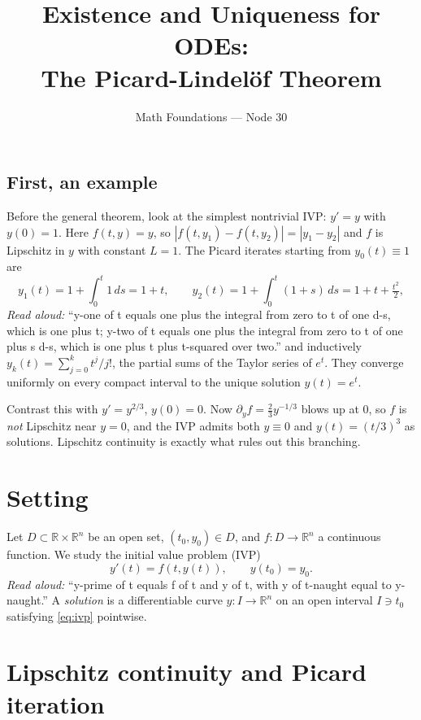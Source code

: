 \documentclass[11pt]{article}
\title{Existence and Uniqueness for ODEs:\\ The Picard-Lindel\"of Theorem}
\author{Math Foundations --- Node 30}
\date{}
\theoremstyle{definition}
\theoremstyle{remark}
\newcommand{\R}{\mathbb{R}}
\begin{document}
\maketitle

\subsection*{First, an example}

Before the general theorem, look at the simplest nontrivial IVP:
$y' = y$ with $y(0) = 1$. Here $f(t, y) = y$, so $|f(t, y_1) - f(t, y_2)|
= |y_1 - y_2|$ and $f$ is Lipschitz in $y$ with constant $L = 1$. The
Picard iterates starting from $y_0(t) \equiv 1$ are
\[
  y_1(t) = 1 + \int_0^t 1 \, ds = 1 + t, \qquad
  y_2(t) = 1 + \int_0^t (1 + s) \, ds = 1 + t + \tfrac{t^2}{2},
\]
\emph{Read aloud:} ``y-one of t equals one plus the integral from zero to t
of one d-s, which is one plus t; y-two of t equals one plus the integral
from zero to t of one plus s d-s, which is one plus t plus t-squared over
two.''
and inductively $y_k(t) = \sum_{j=0}^{k} t^j / j!$, the partial sums of
the Taylor series of $e^t$. They converge uniformly on every compact
interval to the unique solution $y(t) = e^t$.

Contrast this with $y' = y^{2/3}$, $y(0) = 0$. Now $\partial_y f = \tfrac23
y^{-1/3}$ blows up at $0$, so $f$ is \emph{not} Lipschitz near $y = 0$,
and the IVP admits both $y \equiv 0$ and $y(t) = (t/3)^3$ as solutions.
Lipschitz continuity is exactly what rules out this branching.

\section{Setting}

Let $D \subset \R \times \R^n$ be an open set, $(t_0, y_0) \in D$, and
$f : D \to \R^n$ a continuous function. We study the initial value problem
(IVP)
\begin{equation}
  \label{eq:ivp}
  y'(t) = f(t, y(t)), \qquad y(t_0) = y_0.
\end{equation}
\emph{Read aloud:} ``y-prime of t equals f of t and y of t, with y of
t-naught equal to y-naught.''
A \emph{solution} is a differentiable curve $y : I \to \R^n$ on an open
interval $I \ni t_0$ satisfying \eqref{eq:ivp} pointwise.

\section{Lipschitz continuity and Picard iteration}
\end{document}
